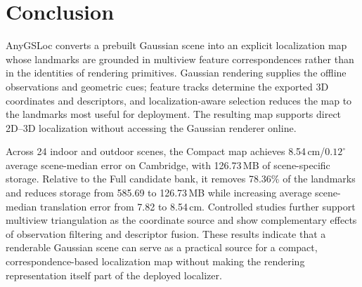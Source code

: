 \section{Conclusion}
\label{sec:conclusion}

AnyGSLoc converts a prebuilt Gaussian scene into an explicit localization map whose landmarks are grounded in multiview feature correspondences rather than in the identities of rendering primitives. Gaussian rendering supplies the offline observations and geometric cues; feature tracks determine the exported 3D coordinates and descriptors, and localization-aware selection reduces the map to the landmarks most useful for deployment. The resulting map supports direct 2D--3D localization without accessing the Gaussian renderer online.

Across 24 indoor and outdoor scenes, the Compact map achieves 8.54\,cm/$0.12^\circ$ average scene-median error on Cambridge, with 126.73\,MB of scene-specific storage. Relative to the Full candidate bank, it removes 78.36\% of the landmarks and reduces storage from 585.69 to 126.73\,MB while increasing average scene-median translation error from 7.82 to 8.54\,cm. Controlled studies further support multiview triangulation as the coordinate source and show complementary effects of observation filtering and descriptor fusion. These results indicate that a renderable Gaussian scene can serve as a practical source for a compact, correspondence-based localization map without making the rendering representation itself part of the deployed localizer.